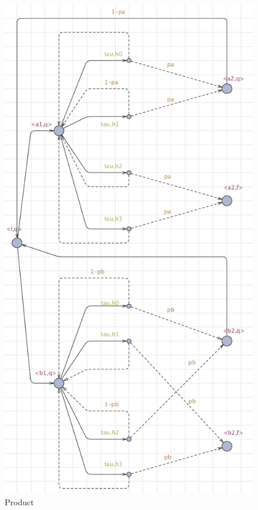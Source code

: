 \begin{figure}
    \raggedright
    \begin{minipage}[t]{0.6\linewidth}  
        \raggedright
        \includegraphics[width=1.6\linewidth]{product.png}  
        \centering  
        \caption{Product}  
    \end{minipage}  
\end{figure}  